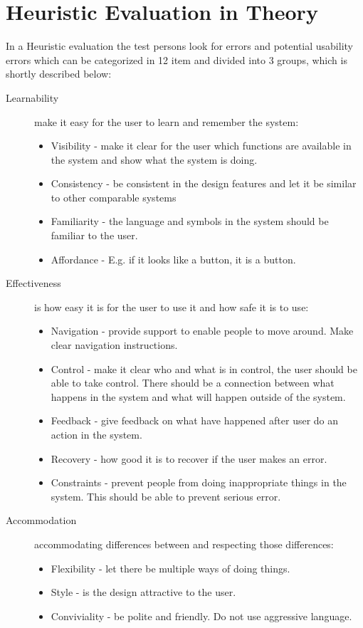\section{Heuristic Evaluation in Theory}
In a Heuristic evaluation the test persons look for errors and potential usability errors which can be categorized in 12 item and divided into 3 groups\citep{DIEB}, which is shortly described below:
\begin{description}
\item[Learnability] make it easy for the user to learn and remember the system:
\begin{itemize}
	\item Visibility - make it clear for the user which functions are available in the system and show what the system is doing.
	\item Consistency - be consistent in the design features and let it be similar to other comparable systems
	\item Familiarity - the language and symbols in the system should be familiar to the user.
	\item Affordance -  E.g. if it looks like a button, it is a button. 
\end{itemize}

\item[Effectiveness] is how easy it is for the user to use it and how safe it is to use:
\begin{itemize}
	\item Navigation - provide support to enable people to move around. Make clear navigation instructions.
	\item Control - make it clear who and what is in control, the user should be able to take control. There should be a connection between what happens in the system and what will happen outside of the system. 
	\item Feedback - give feedback on what have happened after user do an action in the system.
	\item Recovery - how good it is to recover if the user makes an error. 
	\item Constraints - prevent people from doing inappropriate things in the system. This should be able to prevent serious error.
\end{itemize}

\item[Accommodation] accommodating differences between and respecting those differences:
\begin{itemize}
	\item Flexibility - let there be multiple ways of doing things.
	\item Style - is the design attractive to the user. 
	\item Conviviality - be polite and friendly. Do not use aggressive language.
\end{itemize}
\end{description}

